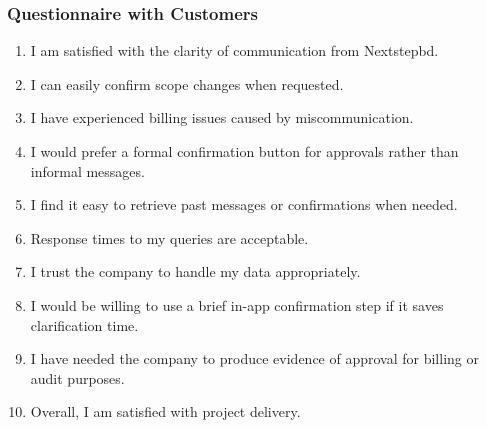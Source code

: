 \documentclass[12pt,a4paper]{report}
\begin{document}
\subsubsection{Questionnaire with Customers}
\begin{enumerate}[leftmargin=2em]
    \item I am satisfied with the clarity of communication from Nextstepbd.
    \item I can easily confirm scope changes when requested.
    \item I have experienced billing issues caused by miscommunication.
    \item I would prefer a formal confirmation button for approvals rather than informal messages.
    \item I find it easy to retrieve past messages or confirmations when needed.
    \item Response times to my queries are acceptable.
    \item I trust the company to handle my data appropriately.
    \item I would be willing to use a brief in-app confirmation step if it saves clarification time.
    \item I have needed the company to produce evidence of approval for billing or audit purposes.
    \item Overall, I am satisfied with project delivery.
\end{enumerate}
\end{document}
